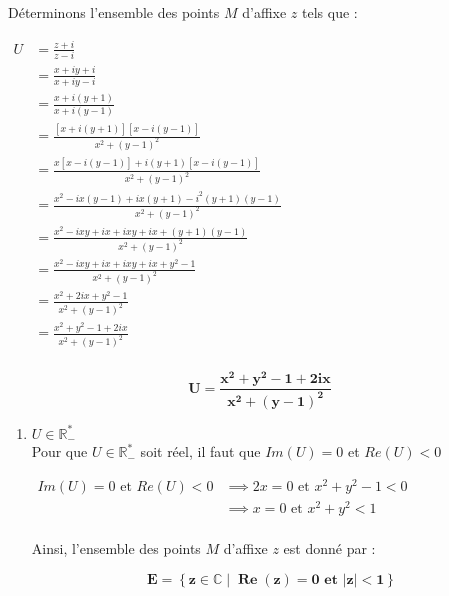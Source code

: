 \documentclass[a4paper,12pt]{article}
\begin{document}
\begin{enumerate}
    Déterminons l’ensemble des points $M$ d’affixe $z$ tels que :
    
    \(
    \begin{aligned}
     U&= \frac{z + i}{z - i}\\
     	&=\frac{x+iy + i}{x+iy - i}\\
     	&=\frac{x+i(y + 1)}{x+i(y - 1)}\\    
     	&=\frac{\left[ x+i(y + 1) \right]\left[ x-i(y - 1) \right]}{x^{2}+(y - 1)^{2}}\\
     	&=\frac{x\left[ x-i(y - 1) \right]+i(y + 1)\left[ x-i(y - 1) \right]}{x^{2}+(y - 1)^{2}}\\
     	&=\frac{x^{2} - ix(y - 1) + ix(y + 1) - i^{2}(y + 1)(y - 1)}{x^{2}+(y - 1)^{2}}\\   	
     	&=\frac{x^{2} - ixy + ix + ixy + ix + (y + 1)(y - 1)}{x^{2}+(y - 1)^{2}}\\ 
     	&=\frac{x^{2} - ixy + ix + ixy + ix + y^{2}-1}{x^{2}+(y - 1)^{2}}\\ 
     	&=\frac{x^{2} +2ix + y^{2}-1}{x^{2}+(y - 1)^{2}}\\ 
     	&=\frac{x^{2} + y^{2}-1+2ix}{x^{2}+(y - 1)^{2}}\\
    \end{aligned}
    \)
\begin{resultbox}
    \[
    \mathbf{U=\frac{x^{2} + y^{2}-1+2ix}{x^{2}+(y - 1)^{2}}}
    \]
\end{resultbox}
    \begin{enumerate}
        \item $U \in \mathbb{R}^*_{-}$\\
        Pour que \( U \in \mathbb{R}^*_{-} \) soit réel, il faut que \( Im(U)=0 \) et \( Re(U)<0 \) 
        
        \( 
        	\begin{aligned}
        	Im(U)=0  \text{ et }  Re(U)<0 &\implies 2x=0 \text{ et } x^{2} + y^{2}-1<0\\
        	 															&\implies x=0 \text{ et } x^{2} + y^{2}<1\\
        	\end{aligned}
        \)

Ainsi, l'ensemble des points \( M \) d'affixe \( z \) est donné par :


\begin{resultbox}
    \[
    \mathbf{E = \left\{ z \in \mathbb{C} \mid \operatorname{Re}(z) = 0 \text{ et } |z| < 1 \right\}}
    \]
\end{resultbox}


\end{enumerate}
\end{enumerate}
\end{document}
